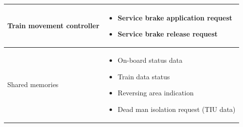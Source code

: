 \documentclass[nocc]{template/openetcs_report}
\begin{document}
\begin{longtable}{|l|l|}
				\hline
				
					\begin{minipage}[t]{0.35\linewidth} Train movement controller	\end{minipage} 
				&	\begin{minipage}[t]{0.65\linewidth}
						\begin{itemize}
							\item Service brake application request
							\item Service brake release request
						\end{itemize}			
					\end{minipage} \\
				
				\hline
				
					\begin{minipage}[t]{0.35\linewidth} Shared memories	\end{minipage} 
				&	\begin{minipage}[t]{0.65\linewidth}
						\begin{itemize}
							\item On-board status data
							\item Train data status
							\item Reversing area indication
							\item Dead man isolation request (TIU data)
						\end{itemize}				
					\end{minipage} \\
				
				\hline	
			\end{longtable}
\newpage				
\end{document}
